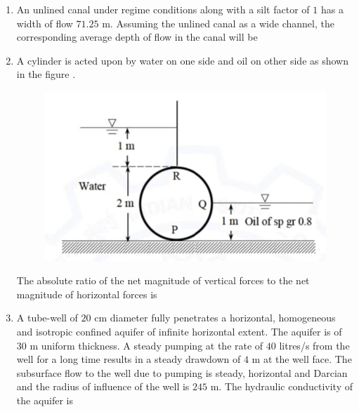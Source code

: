 \documentclass[journal,12pt,onecolumn]{article}
\theoremstyle{remark}
\begin{document}
\begin{enumerate}
\hfill{}

\item An unlined canal under regime conditions along with a silt factor of $1$ has a width of flow $71.25$ m. Assuming the unlined canal as a wide channel, the corresponding average depth of flow  in the canal will be \underline{\hspace{2cm}}

\hfill{}

\item A cylinder  is acted upon by water on one side and oil  on other side as shown in the figure .
\begin{figure}[H]
    \centering
    \includegraphics[width=0.7\columnwidth]{figs/1q49.jpg}
    \caption{}
    \label{fig:q49}
\end{figure}
The absolute ratio of the net magnitude of vertical forces to the net magnitude of horizontal forces  is \underline{\hspace{2cm}}

\hfill{}

\item A tube-well of $20$ cm diameter fully penetrates a horizontal, homogeneous and isotropic confined aquifer of infinite horizontal extent. The aquifer is of $30$ m uniform thickness. A steady pumping at the rate of $40$ litres/s from the well for a long time results in a steady drawdown of $4$ m at the well face. The subsurface flow to the well due to pumping is steady, horizontal and Darcian and the radius of influence of the well is $245$ m. The hydraulic conductivity of the aquifer  is \underline{\hspace{2cm}}


\end{enumerate}
\end{document}
